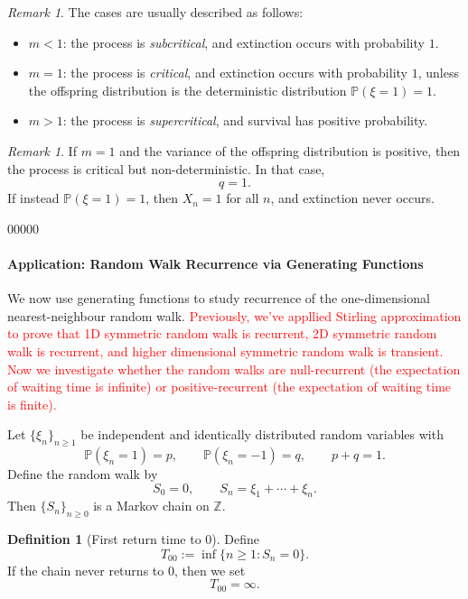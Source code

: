 \documentclass[11pt]{article}
\theoremstyle{plain}
\theoremstyle{definition}
\newtheorem{definition}[theorem]{Definition}
\theoremstyle{remark}
\newtheorem{remark}[theorem]{Remark}
\begin{document}
	\begin{remark}
		The cases are usually described as follows:
		\begin{itemize}[leftmargin=2em]
			\item \(m<1\): the process is \emph{subcritical}, and extinction occurs with probability \(1\).
			\item \(m=1\): the process is \emph{critical}, and extinction occurs with probability \(1\), unless the offspring distribution is the deterministic distribution \(\mathbb{P}(\xi=1)=1\).
			\item \(m>1\): the process is \emph{supercritical}, and survival has positive probability.
		\end{itemize}
	\end{remark}
	
	\begin{remark}
		If \(m=1\) and the variance of the offspring distribution is positive, then the process is critical but non-deterministic. In that case,
		\[
		q=1.
		\]
		If instead \(\mathbb{P}(\xi=1)=1\), then \(X_n=1\) for all \(n\), and extinction never occurs.
	\end{remark}00000
	
	\paragraph{Application: Random Walk Recurrence via Generating Functions}
	We now use generating functions to study recurrence of the one-dimensional nearest-neighbour random walk.
    \textcolor{red}{Previously, we've appllied Stirling approximation to prove that 1D symmetric random walk is recurrent, 2D symmetric random walk is recurrent, and higher dimensional symmetric random walk is transient. Now we investigate whether the random walks are null-recurrent (the expectation of waiting time is infinite) or positive-recurrent (the expectation of waiting time is finite).}
	
	Let \(\{\xi_n\}_{n\ge 1}\) be independent and identically distributed random variables with
	\[
	\mathbb{P}(\xi_n=1)=p,
	\qquad
	\mathbb{P}(\xi_n=-1)=q,
	\qquad
	p+q=1.
	\]
	Define the random walk by
	\[
	S_0=0,
	\qquad
	S_n=\xi_1+\cdots+\xi_n.
	\]
	Then \(\{S_n\}_{n\ge 0}\) is a Markov chain on \(\mathbb{Z}\).
	
	\begin{definition}[First return time to \(0\)]
		Define
		\[
		T_{00}:=\inf\{n\ge 1:S_n=0\}.
		\]
		If the chain never returns to \(0\), then we set
		\[
		T_{00}=\infty.
		\]
	\end{definition}
	
\end{document}
